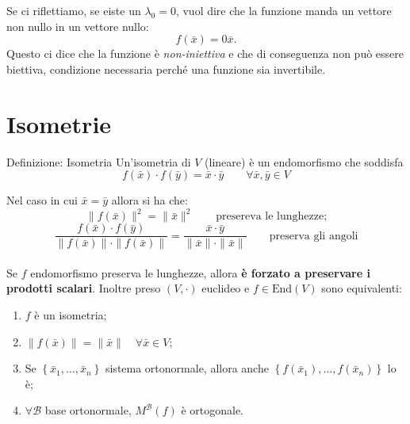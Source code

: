 \documentclass[x11names]{article}
\begin{document}
\noindent
Se ci riflettiamo, se eiste un $\lambda_0 = 0$, vuol dire che la funzione manda un vettore non nullo in  un vettore nullo:
\[
f\left(\bar{x}\right) = 0\bar{x}
.\] 
Questo ci dice che la funzione è \textit{non-iniettiva} e che di conseguenza non può essere biettiva, condizione necessaria perché una funzione sia invertibile.





\section{Isometrie}
	\begin{center}
	\colorbox{myblue}{\begin{minipage}{5.75in}
			\begin{blues}{Definizione: Isometria}
				Un'isometria di $V$ (lineare) è un endomorfismo che soddisfa
				\[
				f(\bar{x}) \cdot f(\bar{y}) = \bar{x} \cdot \bar{y} \qquad \forall \bar{x},\bar{y} \in V
				\]
			\end{blues}
	\end{minipage}}       
\end{center}

Nel caso in cui $\bar{x} = \bar{y}$ allora si ha che:
\[
\| f(\bar{x}) \|^2  = \| \bar{x} \|^2 \qquad \text{presereva le lunghezze;}
\]
\[
\frac{f(\bar{x})\cdot f(\bar{y})}{\| f(\bar{x}) \| \cdot \| f(\bar{x}) \|} = \frac{\bar{x}\cdot \bar{y}}{\| \bar{x} \| \cdot \| \bar{x} \|} \qquad \text{preserva gli angoli}
\] \\

\noindent
Se $f$ endomorfismo preserva le lunghezze, allora \textbf{è forzato a preservare i prodotti scalari}. Inoltre preso $(V,\cdot)$ euclideo e $f\in \text{End}(V)$ sono equivalenti:
\begin{enumerate}
	\item $f$ è un isometria;
	\item $\| f(\bar{x}) \|  = \| \bar{x} \| \quad \forall \bar{x} \in V$;
	\item Se $\left\{\bar{x}_{1},\dots,\bar{x}_{n}\right\}$ sistema ortonormale, allora anche $\left\{f(\bar{x}_{1}),\dots,f(\bar{x}_{n})\right\}$ lo è;
	\item $\forall \mathcal{B}$ base ortonormale, $M^\mathcal{B}(f)$ è ortogonale.
\end{enumerate}
\end{document}
